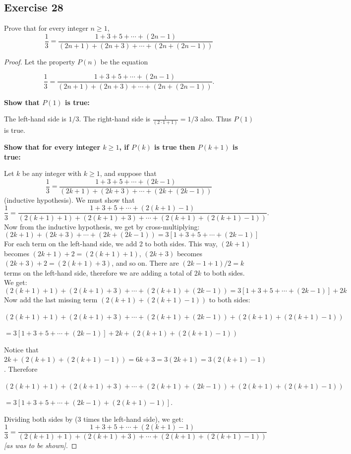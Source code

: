 \documentclass[14pt]{extarticle}
\newcommand{\dps}{\displaystyle}
\newcommand{\cy}{\color{cyan}}
\begin{document}
\subsection{Exercise 28}
Prove that for every integer $n \geq 1$,
\[
\frac{1}{3} = \frac{1 + 3 + 5 + \cdots + (2n-1)}{(2n+1) + (2n+3) + \cdots + (2n + (2n-1))}
\]
\begin{proof}
Let the property $P(n)$ be the equation 

\[
\dps \frac{1}{3} = \frac{1 + 3 + 5 + \cdots + (2n-1)}{(2n+1) + (2n+3) + \cdots + (2n + (2n-1))}.
\] 

{\bf Show that $P(1)$ is true:} 

The left-hand side is $1/3$. The right-hand side is $\dps \frac{1}{(2 \cdot 1 + 1)} = 1/3$ also. Thus $P(1)$ is true. 

{\bf Show that for every integer $k \geq 1$, if $P(k)$ is true then $P(k + 1)$ is true:} 

Let $k$ be any integer with $k \geq 1$, and suppose that 
\[
\dps \frac{1}{3} = \frac{1 + 3 + 5 + \cdots + (2k-1)}{(2k+1) + (2k+3) + \cdots + (2k + (2k-1))}
\]
({\cy inductive hypothesis}). We must show that 
\[
\dps \frac{1}{3} = \frac{1 + 3 + 5 + \cdots + (2(k+1)-1)}{(2(k+1)+1) + (2(k+1)+3) + \cdots + (2(k+1) + (2(k+1)-1))}.\] 
Now from the inductive hypothesis, we get by cross-multiplying:
\[
(2k+1) + (2k+3) + \cdots + (2k + (2k-1)) = 3[1 + 3 + 5 + \cdots + (2k-1)]
\]
For each term on the left-hand side, we add 2 to both sides. This way, $(2k + 1)$ becomes $(2k + 1) + 2 = (2(k+1) + 1)$, $(2k + 3)$ becomes $(2k + 3) + 2 = (2(k+1) + 3)$, and so on. There are $(2k - 1 + 1) / 2 = k$ terms on the left-hand side, therefore we are adding a total of $2k$ to both sides. We get:
\[
(2(k+1)+1) + (2(k+1)+3) + \cdots + (2(k+1) + (2k-1)) = 3[1 + 3 + 5 + \cdots + (2k-1)] + 2k
\]
Now add the last missing term $(2(k+1) + (2(k+1)-1))$ to both sides:

$(2(k+1)+1) + (2(k+1)+3) + \cdots + (2(k+1) + (2k-1)) + (2(k+1) + (2(k+1)-1))$

$ = 3[1 + 3 + 5 + \cdots + (2k-1)] + 2k + (2(k+1) + (2(k+1)-1))$

Notice that $2k + (2(k+1) + (2(k+1)-1)) = 6k + 3 = 3(2k+1) = 3(2(k+1) - 1)$. Therefore

$(2(k+1)+1) + (2(k+1)+3) + \cdots + (2(k+1) + (2k-1)) + (2(k+1) + (2(k+1)-1))$

$ = 3[1 + 3 + 5 + \cdots + (2k-1) + (2(k+1)-1)]$.

Dividing both sides by (3 times the left-hand side), we get:
\[
\dps \frac{1}{3} = \frac{1 + 3 + 5 + \cdots + (2(k+1)-1)}{(2(k+1)+1) + (2(k+1)+3) + \cdots + (2(k+1) + (2(k+1)-1))}\] 
{\it [as was to be shown]}.
\end{proof}
\end{document}
